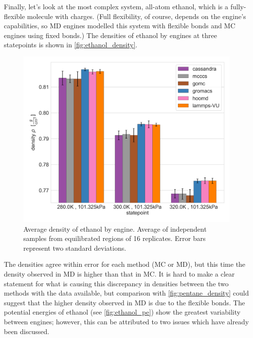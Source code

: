 Finally, let's look at the most complex system, all-atom ethanol, which is a fully-flexible molecule with charges.
(Full flexibility, of course, depends on the engine's capabilities, so MD engines modelled this system with flexible bonds and MC engines using fixed bonds.)
The densities of ethanol by engines at three statepoints is shown in \autoref{fig:ethanol_density}.
\begin{figure}[h!]
    \centering
    \includegraphics[width=0.8\linewidth,keepaspectratio]{figures/rep_study/ethanolAA_summary.png}
    \caption{Average density of ethanol by engine. Average of independent samples from equilibrated regions of 16 replicates. Error bars represent two standard deviations.}\label{fig:ethanol_density}
\end{figure}
The densities agree within error for each method (MC or MD), but this time the density observed in MD is higher than that in MC.
It is hard to make a clear statement for what is causing this discrepancy in densities between the two methods with the data available, but comparison with \autoref{fig:pentane_density} could suggest that the higher density observed in MD is due to the flexible bonds.
The potential energies of ethanol (see \autoref{fig:ethanol_pe}) show the greatest variability between engines; however, this can be attributed to two issues which have already been discussed.
